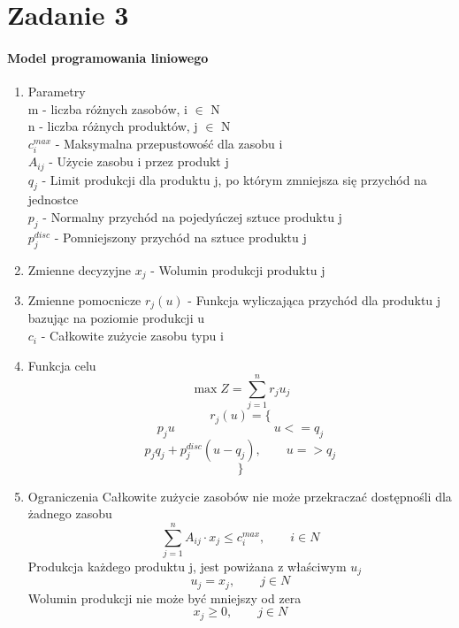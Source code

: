\section{Zadanie 3}
\paragraph{Model programowania liniowego}
\begin{enumerate}
\item Parametry \\
m - liczba różnych zasobów, i $\in$ N \\ 
n - liczba różnych produktów, j $\in$ N \\
$c_{i}^{max}$ - Maksymalna przepustowość dla zasobu i \\
$A_{ij}$ - Użycie zasobu i przez produkt j \\ 
$q_j$ - Limit produkcji dla produktu j, po którym zmniejsza się przychód na jednostce \\
$p_j$ - Normalny przychód na pojedyńczej sztuce produktu j \\ 
$p_j^{disc}$ - Pomniejszony przychód na sztuce produktu j 

\item Zmienne decyzyjne 
$x_j$ - Wolumin produkcji produktu j 
\item Zmienne pomocnicze 
$r_j(u)$ - Funkcja wyliczająca przychód dla produktu j bazując na poziomie produkcji u \\ 
$c_i$ - Całkowite zużycie zasobu typu i 

\item Funkcja celu 
\[ \max Z = \sum_{j=1}^n r_j u_j \] 
\[ r_j(u) = \{ \]
\[    p_{j} u \qquad \qquad \qquad \qquad u <= q_j  \]
\[    p_j q_j + p_{j}^{disc}(u-q_j), \qquad u => q_j \]
\[ \} \]

\item Ograniczenia 
\setcounter{equation}{0}
Całkowite zużycie zasobów nie może przekraczać dostępnośli dla żadnego zasobu
\begin{equation}
\sum_{j=1}^n A_{ij} \cdot x_j \leq c_i^{max}, \qquad i \in N
\end{equation}
Produkcja każdego produktu j, jest powiżana z właściwym $u_j$
\begin{equation}
u_j = x_j, \qquad j \in N
\end{equation}
Wolumin produkcji nie może być mniejszy od zera
\begin{equation}
x_j \geq 0, \qquad j \in N
\end{equation}


\end{enumerate}
